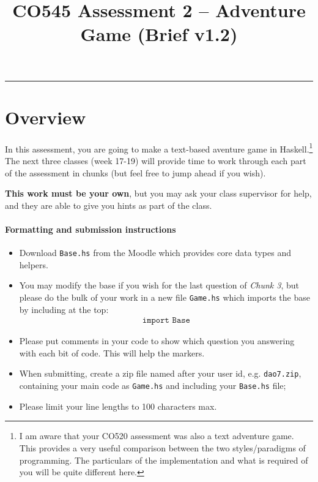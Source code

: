 \documentclass{article}
\date{}
\title{\vspace{-5em}CO545 Assessment 2 -- Adventure Game
{\footnotesize{(Brief v1.2)}}}
\begin{document}
\maketitle
\vspace{-5em}
\hrule
\vspace{1em}

\section{Overview}

In this assessment, you are going to make a text-based aventure game
in Haskell.\footnote{I am aware that your CO520 assessment was also a
  text adventure game. This provides a very useful comparison between
  the two styles/paradigms of programming. The particulars of the
  implementation and what is required of you will be quite different
  here. } The next three classes (week 17-19) will provide time
to work through each part of the assessment in chunks (but feel free
to jump ahead if you wish).

\textbf{This work must be your own}, but you may ask your class supervisor
for help, and they are able to give you hints as part of the class.

\paragraph{Formatting and submission instructions}
%
\begin{itemize}[itemsep=0.1em]
\item Download \texttt{Base.hs} from the Moodle which provides core
  data types and helpers.

\item You may modify the base if you wish for the last question of
  \textit{Chunk 3}, but please do the bulk of your work in a new file
  \texttt{Game.hs} which imports the base by including at the top:
%
\begin{align*}
\texttt{import Base}
\end{align*}
%

\item Please put comments in your code to show which question
you answering with each bit of code. This will help the markers.

\item When submitting, create a zip file named after your user id,
  e.g. \texttt{dao7.zip}, containing your main code as
  \texttt{Game.hs} and including your \texttt{Base.hs} file;

\item Please limit your line lengths to 100 characters max.
\end{itemize}
%
\end{document}
